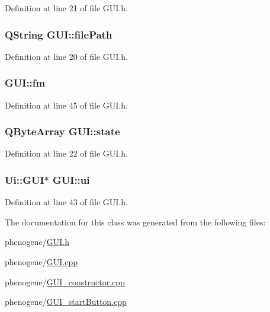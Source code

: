 Definition at line 21 of file G\-U\-I.\-h.

\hypertarget{a00002_a62d0a4c604ed8d65f85455971a938548}{
\subsubsection[{file\-Path}]{\setlength{\rightskip}{0pt plus 5cm}Q\-String G\-U\-I\-::file\-Path\hspace{0.3cm}{\ttfamily [private]}}}\label{d7/d46/a00002_a62d0a4c604ed8d65f85455971a938548}


Definition at line 20 of file G\-U\-I.\-h.

\hypertarget{a00002_a73cc90505024488d2fd77762ad5059c4}{
\subsubsection[{fm}]{ G\-U\-I\-::fm\hspace{0.3cm}{\ttfamily [private]}}}\label{d7/d46/a00002_a73cc90505024488d2fd77762ad5059c4}


Definition at line 45 of file G\-U\-I.\-h.

\hypertarget{a00002_aa3abed87f53b22188d76a134e427b30d}{
\subsubsection[{state}]{\setlength{\rightskip}{0pt plus 5cm}Q\-Byte\-Array G\-U\-I\-::state\hspace{0.3cm}{\ttfamily [private]}}}\label{d7/d46/a00002_aa3abed87f53b22188d76a134e427b30d}


Definition at line 22 of file G\-U\-I.\-h.

\hypertarget{a00002_acdbca1224663f5a19bd1ad4e7c885886}{
\subsubsection[{ui}]{\setlength{\rightskip}{0pt plus 5cm}Ui\-::\-G\-U\-I$\ast$ G\-U\-I\-::ui\hspace{0.3cm}{\ttfamily [private]}}}\label{d7/d46/a00002_acdbca1224663f5a19bd1ad4e7c885886}


Definition at line 43 of file G\-U\-I.\-h.



The documentation for this class was generated from the following files\-:\begin{DoxyCompactItemize}
\item 
phenogene/\hyperlink{a00010}{G\-U\-I.\-h}\item 
phenogene/\hyperlink{a00009}{G\-U\-I.\-cpp}\item 
phenogene/\hyperlink{a00011}{G\-U\-I\-\_\-constructor.\-cpp}\item 
phenogene/\hyperlink{a00012}{G\-U\-I\-\_\-start\-Button.\-cpp}\end{DoxyCompactItemize}

